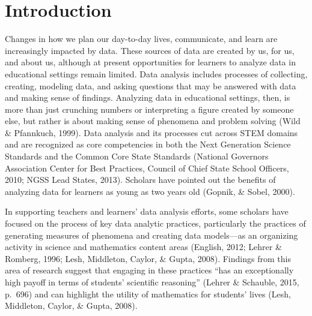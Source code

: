 \documentclass[]{msu-thesis}
\theoremstyle{definition}
\theoremstyle{definition}
\theoremstyle{definition}
\theoremstyle{remark}
\begin{document}
\SingleSpacing
\tableofcontents* %
\clearpage
\listoftables %
\clearpage
\listoffigures %
\mainmatter
%

\chapter{Introduction}\label{intro}

\DoubleSpacing

Changes in how we plan our day-to-day lives, communicate, and learn are
increasingly impacted by data. These sources of data are created by us,
for us, and about us, although at present opportunities for learners to
analyze data in educational settings remain limited. Data analysis
includes processes of collecting, creating, modeling data, and asking
questions that may be answered with data and making sense of findings.
Analyzing data in educational settings, then, is more than just
crunching numbers or interpreting a figure created by someone else, but
rather is about making sense of phenomena and problem solving (Wild \&
Pfannkuch, 1999). Data analysis and its processes cut across STEM
domains and are recognized as core competencies in both the Next
Generation Science Standards and the Common Core State Standards
(National Governors Association Center for Best Practices, Council of
Chief State School Officers, 2010; NGSS Lead States, 2013). Scholars
have pointed out the benefits of analyzing data for learners as young as
two years old (Gopnik, \& Sobel, 2000).

In supporting teachers and learners' data analysis efforts, some
scholars have focused on the process of key data analytic practices,
particularly the practices of generating measures of phenomena and
creating data models---as an organizing activity in science and
mathematics content areas (English, 2012; Lehrer \& Romberg, 1996; Lesh,
Middleton, Caylor, \& Gupta, 2008). Findings from this area of research
suggest that engaging in these practices ``has an exceptionally high
payoff in terms of students' scientific reasoning'' (Lehrer \& Schauble,
2015, p.~696) and can highlight the utility of mathematics for students'
lives (Lesh, Middleton, Caylor, \& Gupta, 2008).
\end{document}
